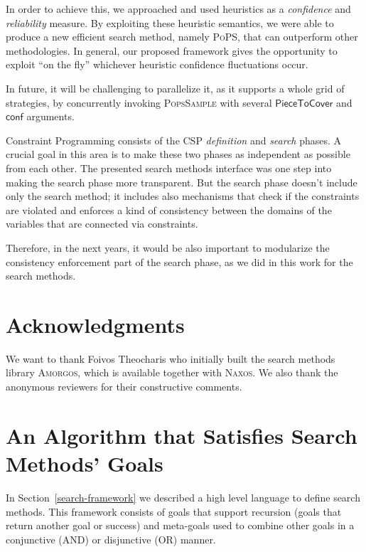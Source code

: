 \documentclass{ws-ijait}
\begin{document}
In order to achieve this, we approached and used heuristics
as a \emph{confidence} and \emph{reliability} measure. By
exploiting these heuristic semantics, we were able to
produce a new efficient search method, namely \textsc{PoPS},
that can outperform other methodologies. In general, our
proposed framework gives the opportunity to exploit ``on the
fly'' whichever heuristic confidence fluctuations occur.

In future, it will be challenging to parallelize it, as it
supports a whole grid of strategies, by concurrently
invoking \textsc{PopsSample} with several
$\mathsf{PieceToCover}$ and $\mathsf{conf}$ arguments.

Constraint Programming consists of the CSP \emph{definition}
and \emph{search} phases. A crucial goal in this area is to
make these two phases as independent as possible from each
other.\cite{Freuder2014} The presented search methods
interface was one step into making the search phase more
transparent. But the search phase doesn't include only the
search method; it includes also mechanisms that check if the
constraints are violated and enforces a kind of consistency
between the domains of the variables that are connected via
constraints.\cite{Chen2013}

Therefore, in the next years, it would be also important to
modularize the consistency enforcement part of the search
phase, as we did in this work for the search methods.


\section*{Acknowledgments}

We want to thank Foivos Theocharis who initially built the
search methods library \textsc{Amorgos}, which is available
together with \textsc{Naxos}.\cite{Naxos} We also thank the
anonymous reviewers for their constructive comments.





\appendix

\section{An Algorithm that Satisfies Search Methods'
         Goals\label{framework-algorithm}}

In Section~\ref{search-framework} we described a high level
language to define search methods. This framework consists
of goals that support recursion (goals that return another
goal or success) and meta-goals used to combine other goals
in a conjunctive (\textsf{AND}) or disjunctive (\textsf{OR})
manner.
\end{document}
